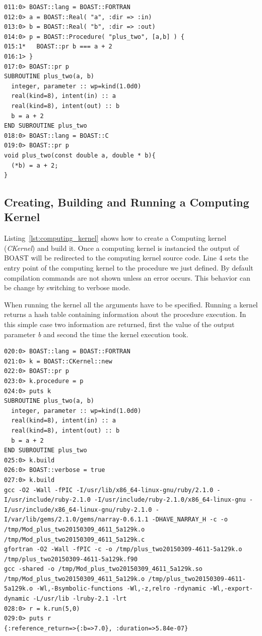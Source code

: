 \documentclass[11pt, a4paper, twoside]{montblanc}
\begin{document}
\begin{lstlisting}
011:0> BOAST::lang = BOAST::FORTRAN
012:0> a = BOAST::Real( "a", :dir => :in)
013:0> b = BOAST::Real( "b", :dir => :out)
014:0> p = BOAST::Procedure( "plus_two", [a,b] ) {
015:1*   BOAST::pr b === a + 2
016:1> }
017:0> BOAST::pr p
SUBROUTINE plus_two(a, b)
  integer, parameter :: wp=kind(1.0d0)
  real(kind=8), intent(in) :: a
  real(kind=8), intent(out) :: b
  b = a + 2
END SUBROUTINE plus_two
018:0> BOAST::lang = BOAST::C
019:0> BOAST::pr p
void plus_two(const double a, double * b){
  (*b) = a + 2;
}
\end{lstlisting}

\subsection*{Creating, Building and Running a Computing Kernel}

Listing~\ref{lst:computing_kernel} shows how to create a Computing kernel
(\textit{CKernel}) and build it. Once a computing kernel is instancied the
output of BOAST will be redirected to the computing kernel source code. Line 4
sets the entry point of the computing kernel to the procedure we just defined.
By default compilation commands are not shown unless an error occurs. This
behavior can be change by switching to verbose mode.

When running the kernel all the arguments have to be specified. Running a
kernel returns a hash table containing information about the procedure
execution. In this simple case two information are returned, first the value
of the output parameter \textit{b} and second the time the kernel execution
took.

\begin{lstlisting}
020:0> BOAST::lang = BOAST::FORTRAN
021:0> k = BOAST::CKernel::new
022:0> BOAST::pr p
023:0> k.procedure = p
024:0> puts k
SUBROUTINE plus_two(a, b)
  integer, parameter :: wp=kind(1.0d0)
  real(kind=8), intent(in) :: a
  real(kind=8), intent(out) :: b
  b = a + 2
END SUBROUTINE plus_two
025:0> k.build
026:0> BOAST::verbose = true
027:0> k.build
gcc -O2 -Wall -fPIC -I/usr/lib/x86_64-linux-gnu/ruby/2.1.0 -I/usr/include/ruby-2.1.0 -I/usr/include/ruby-2.1.0/x86_64-linux-gnu -I/usr/include/x86_64-linux-gnu/ruby-2.1.0 -I/var/lib/gems/2.1.0/gems/narray-0.6.1.1 -DHAVE_NARRAY_H -c -o /tmp/Mod_plus_two20150309_4611_5a129k.o /tmp/Mod_plus_two20150309_4611_5a129k.c
gfortran -O2 -Wall -fPIC -c -o /tmp/plus_two20150309-4611-5a129k.o /tmp/plus_two20150309-4611-5a129k.f90
gcc -shared -o /tmp/Mod_plus_two20150309_4611_5a129k.so /tmp/Mod_plus_two20150309_4611_5a129k.o /tmp/plus_two20150309-4611-5a129k.o -Wl,-Bsymbolic-functions -Wl,-z,relro -rdynamic -Wl,-export-dynamic -L/usr/lib -lruby-2.1 -lrt
028:0> r = k.run(5,0)
029:0> puts r
{:reference_return=>{:b=>7.0}, :duration=>5.84e-07}
\end{lstlisting}
\end{document}
